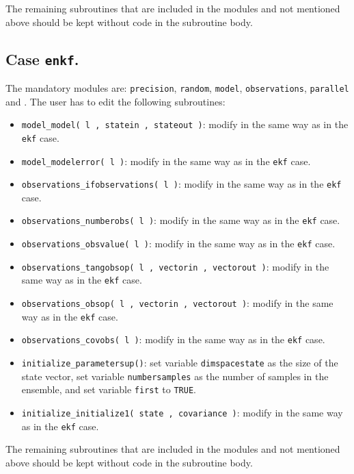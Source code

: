 \documentclass[12pt]{article}
\begin{document}
The remaining subroutines that are included in the modules and not mentioned above should be kept without code in the subroutine body.

\subsection{Case {\tt enkf}.}
The mandatory modules are: {\tt precision}, {\tt random}, {\tt model}, {\tt observations}, {\tt parallel} and . The user has to edit the following subroutines:
\begin{itemize}
\item {\tt model\_model( l , statein , stateout )}: modify in the same way as in the {\tt ekf} case.
\item {\tt model\_modelerror( l )}: modify in the same way as in the {\tt ekf} case.
\item {\tt observations\_ifobservations( l )}: modify in the same way as in the {\tt ekf} case.
\item {\tt observations\_numberobs( l )}: modify in the same way as in the {\tt ekf} case.
\item {\tt observations\_obsvalue( l )}: modify in the same way as in the {\tt ekf} case.
\item {\tt observations\_tangobsop( l , vectorin , vectorout )}: modify in the same way as in the {\tt ekf} case.
\item {\tt observations\_obsop( l , vectorin , vectorout )}: modify in the same way as in the {\tt ekf} case.
\item {\tt observations\_covobs( l )}: modify in the same way as in the {\tt ekf} case.
\item {\tt initialize\_parametersup()}: set variable {\tt dimspacestate} as the size of the state vector, set variable {\tt numbersamples} as the number of samples in the ensemble, and set variable {\tt first} to {\tt TRUE}.
\item {\tt initialize\_initialize1( state , covariance )}: modify in the same way as in the {\tt ekf} case.
\end{itemize}

The remaining subroutines that are included in the modules and not mentioned above should be kept without code in the subroutine body.

\end{document}
